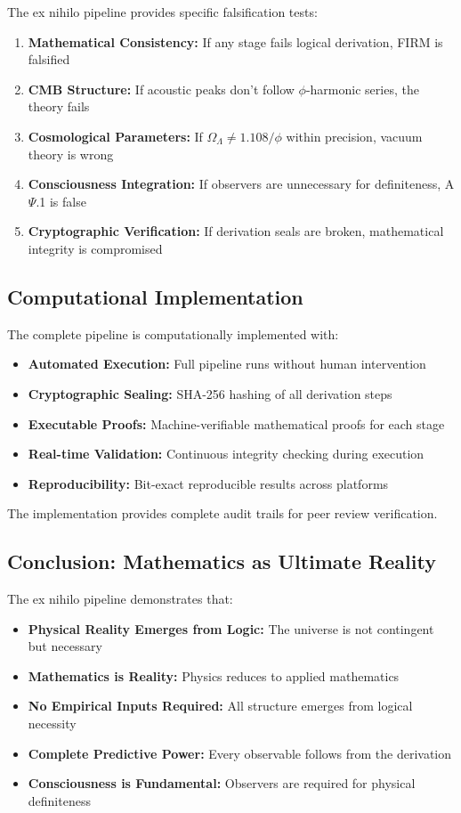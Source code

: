The ex nihilo pipeline provides specific falsification tests:

\begin{enumerate}
\item \textbf{Mathematical Consistency:} If any stage fails logical derivation, FIRM is falsified
\item \textbf{CMB Structure:} If acoustic peaks don't follow $\phi$-harmonic series, the theory fails
\item \textbf{Cosmological Parameters:} If $\Omega_\Lambda \neq 1.108/\phi$ within precision, vacuum theory is wrong
\item \textbf{Consciousness Integration:} If observers are unnecessary for definiteness, A$\Psi$.1 is false
\item \textbf{Cryptographic Verification:} If derivation seals are broken, mathematical integrity is compromised
\end{enumerate}

\subsection{Computational Implementation}

The complete pipeline is computationally implemented with:

\begin{itemize}
\item \textbf{Automated Execution:} Full pipeline runs without human intervention
\item \textbf{Cryptographic Sealing:} SHA-256 hashing of all derivation steps
\item \textbf{Executable Proofs:} Machine-verifiable mathematical proofs for each stage
\item \textbf{Real-time Validation:} Continuous integrity checking during execution
\item \textbf{Reproducibility:} Bit-exact reproducible results across platforms
\end{itemize}

The implementation provides complete audit trails for peer review verification.

\subsection{Conclusion: Mathematics as Ultimate Reality}

The ex nihilo pipeline demonstrates that:

\begin{itemize}
\item \textbf{Physical Reality Emerges from Logic:} The universe is not contingent but necessary
\item \textbf{Mathematics is Reality:} Physics reduces to applied mathematics
\item \textbf{No Empirical Inputs Required:} All structure emerges from logical necessity  
\item \textbf{Complete Predictive Power:} Every observable follows from the derivation
\item \textbf{Consciousness is Fundamental:} Observers are required for physical definiteness
\end{itemize}

